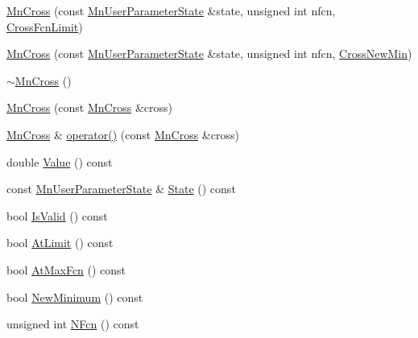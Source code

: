 \begin{DoxyCompactItemize}
\item 
\mbox{\hyperlink{classROOT_1_1Minuit2_1_1MnCross_ad306883aae64c6bd2d4acd8adbb28c9e}{Mn\+Cross}} (const \mbox{\hyperlink{classROOT_1_1Minuit2_1_1MnUserParameterState}{Mn\+User\+Parameter\+State}} \&state, unsigned int nfcn, \mbox{\hyperlink{classROOT_1_1Minuit2_1_1MnCross_1_1CrossFcnLimit}{Cross\+Fcn\+Limit}})
\item 
\mbox{\hyperlink{classROOT_1_1Minuit2_1_1MnCross_a8508fcf20167952cb8f53427d348e2dc}{Mn\+Cross}} (const \mbox{\hyperlink{classROOT_1_1Minuit2_1_1MnUserParameterState}{Mn\+User\+Parameter\+State}} \&state, unsigned int nfcn, \mbox{\hyperlink{classROOT_1_1Minuit2_1_1MnCross_1_1CrossNewMin}{Cross\+New\+Min}})
\item 
\mbox{\hyperlink{classROOT_1_1Minuit2_1_1MnCross_a34f9825f828387bc92e6e7aaac8ced84}{$\sim$\+Mn\+Cross}} ()
\item 
\mbox{\hyperlink{classROOT_1_1Minuit2_1_1MnCross_ac4526685d7655e69378fd2cc844d0e55}{Mn\+Cross}} (const \mbox{\hyperlink{classROOT_1_1Minuit2_1_1MnCross}{Mn\+Cross}} \&cross)
\item 
\mbox{\hyperlink{classROOT_1_1Minuit2_1_1MnCross}{Mn\+Cross}} \& \mbox{\hyperlink{classROOT_1_1Minuit2_1_1MnCross_a12f4058d5a3b758cbaa68a0a9bc0cebb}{operator()}} (const \mbox{\hyperlink{classROOT_1_1Minuit2_1_1MnCross}{Mn\+Cross}} \&cross)
\item 
double \mbox{\hyperlink{classROOT_1_1Minuit2_1_1MnCross_af7cebab3edb3fedaf0e4ce0704e1196f}{Value}} () const
\item 
const \mbox{\hyperlink{classROOT_1_1Minuit2_1_1MnUserParameterState}{Mn\+User\+Parameter\+State}} \& \mbox{\hyperlink{classROOT_1_1Minuit2_1_1MnCross_a97ba8e698ee948a842f0ebe198c0d528}{State}} () const
\item 
bool \mbox{\hyperlink{classROOT_1_1Minuit2_1_1MnCross_a9cee17151ec7e078fc6efbfa32120a1a}{Is\+Valid}} () const
\item 
bool \mbox{\hyperlink{classROOT_1_1Minuit2_1_1MnCross_a01119708c6c9aa2a5b16222705cad954}{At\+Limit}} () const
\item 
bool \mbox{\hyperlink{classROOT_1_1Minuit2_1_1MnCross_a785c82249ecae395a16536cfc64aa610}{At\+Max\+Fcn}} () const
\item 
bool \mbox{\hyperlink{classROOT_1_1Minuit2_1_1MnCross_aaf90f3645fb5fcc67b49ffd24f4a12ba}{New\+Minimum}} () const
\item 
unsigned int \mbox{\hyperlink{classROOT_1_1Minuit2_1_1MnCross_a52cc0559ea27a2d8fe3f9961670e1544}{N\+Fcn}} () const
\item 

\end{DoxyCompactItemize}
